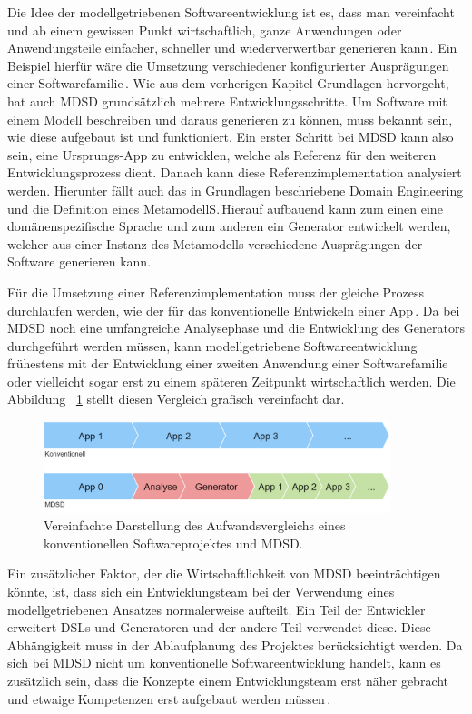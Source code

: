 \documentclass[12pt,oneside,a4paper,parskip]{scrbook}
\begin{document}
Die Idee der modellgetriebenen Softwareentwicklung ist es, dass man vereinfacht und ab einem gewissen Punkt wirtschaftlich, ganze Anwendungen oder Anwendungsteile einfacher, schneller und wiederverwertbar generieren kann\,\cite[S.\,14f.]{stahl2007}. Ein Beispiel hierfür wäre die Umsetzung verschiedener konfigurierter Ausprägungen einer Softwarefamilie\,\cite[S.\,237ff.]{stahl2007}. Wie aus dem vorherigen Kapitel Grundlagen hervorgeht, hat auch MDSD grundsätzlich mehrere Entwicklungsschritte. Um Software mit einem Modell beschreiben und daraus generieren zu können, muss bekannt sein, wie diese aufgebaut ist und funktioniert. Ein erster Schritt bei MDSD kann also sein, eine Ursprungs-App zu entwicklen, welche als Referenz für den weiteren Entwicklungsprozess dient. Danach kann diese Referenzimplementation analysiert werden. Hierunter fällt auch das in Grundlagen beschriebene Domain Engineering und die Definition eines MetamodellS.\,Hierauf aufbauend kann zum einen eine domänenspezifische Sprache und zum anderen ein Generator entwickelt werden, welcher aus einer Instanz des Metamodells verschiedene Ausprägungen der Software generieren kann.

Für die Umsetzung einer Referenzimplementation muss der gleiche Prozess durchlaufen werden, wie der für das konventionelle Entwickeln einer App\,\cite[S.\,219f.]{stahl2007}. Da bei MDSD noch eine umfangreiche Analysephase und die Entwicklung des Generators durchgeführt werden müssen, kann modellgetriebene Softwareentwicklung frühestens mit der Entwicklung einer zweiten Anwendung einer Softwarefamilie oder vielleicht sogar erst zu einem späteren Zeitpunkt wirtschaftlich werden. Die Abbildung ~\ref{fig:vgl1} stellt diesen Vergleich grafisch vereinfacht dar.

\begin{figure}[htbp]
\centering
\includegraphics[width=0.9\textwidth]{bilder/vergleich_1}
\caption{Vereinfachte Darstellung des Aufwandsvergleichs eines konventionellen Softwareprojektes und MDSD.}
\label{fig:vgl1}
\end{figure}

Ein zusätzlicher Faktor, der die Wirtschaftlichkeit von MDSD beeinträchtigen könnte, ist, dass sich ein Entwicklungsteam bei der Verwendung eines modellgetriebenen Ansatzes normalerweise aufteilt. Ein Teil der Entwickler erweitert DSLs und Generatoren und der andere Teil verwendet diese. Diese Abhängigkeit muss in der Ablaufplanung des Projektes berücksichtigt werden. Da sich bei MDSD nicht um konventionelle Softwareentwicklung handelt, kann es zusätzlich sein, dass die Konzepte einem Entwicklungsteam erst näher gebracht und etwaige Kompetenzen erst aufgebaut werden müssen\,\cite[S.\,44ff.]{voelter2013}.
\end{document}
